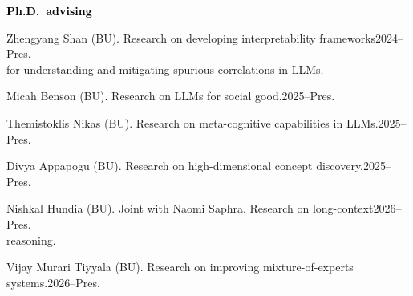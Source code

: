 \documentclass[10pt]{article}
\renewcommand{\subsection}[1]{\textcolor{black}{#1}}
\newcommand{\halfblankline}{\quad\vspace{-0.5\baselineskip}\pagebreak[3]}
\begin{document}
	\subsection{\textbf{Ph.D.\ advising}}
	\begin{innerlist}
	\item Zhengyang Shan (BU). Research on developing interpretability frameworks\hfill 2024--Pres.\\
	      for understanding and mitigating spurious correlations in LLMs.
	\item Micah Benson (BU). Research on LLMs for social good.\hfill 2025--Pres.
	\item Themistoklis Nikas (BU). Research on meta-cognitive capabilities in LLMs.\hfill 2025--Pres.
	\item Divya Appapogu (BU). Research on high-dimensional concept discovery.\hfill 2025--Pres.
	\item Nishkal Hundia (BU). Joint with Naomi Saphra. Research on long-context\hfill 2026--Pres.\\reasoning.
	\item Vijay Murari Tiyyala (BU). Research on improving mixture-of-experts systems.\hfill 2026--Pres.
	\end{innerlist}

	\halfblankline
\end{document}
